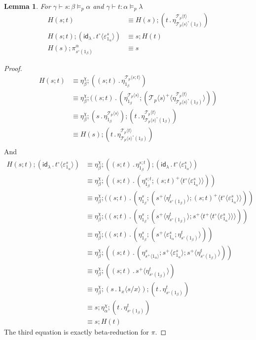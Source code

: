 \documentclass[10pt]{article}
\newtheorem{lemma}{Lemma}
\theoremstyle{definition}
\newcommand{\yields}{\vdash}
\newcommand\TrCirc[2]{\ensuremath{{#1}^\circ(#2)}}
\newcommand{\id}{\mathsf{id}}
\newcommand\ApEl[2]{\mathcal{T}_{#1}\langle#2\rangle}
\newcommand\ap[2]{\ensuremath{#1 \langle #2 \rangle }}
\newcommand\ApPlus[2]{\ensuremath{{#1}^+ \langle #2 \rangle }}
\newcommand\bdot[0]{\mathbin{.}}
\begin{document}
\begin{lemma}\label{lemma:h-on-composite}
For $\gamma \yields s : \beta \vDash_p \alpha$ and $\gamma \yields t : \alpha \vDash_p \lambda$
\begin{align*}
H(s;t) &\equiv H(s) ; (t \bdot \eta^{\ApEl{p}{t}}_{\TrCirc{\ApEl{p}{s}}{1_\beta}}) \\
H(s ; t) ; (\id_\lambda \bdot \ap{t^\circ}{\varepsilon^{s}_{1_{\alpha}}}) &\equiv s ; H(t) \\
H(s) ; \pi^\alpha_{\TrCirc{s}{1_\beta}} &\equiv s
\end{align*}
\end{lemma}
\begin{proof}
\begin{align*}
H(s;t)
&\equiv \eta^\chi_\beta ; ((s;t) \bdot \eta^{\ApEl{p}{s;t}}_{1_\beta}) \\
&\equiv \eta^\chi_\beta ; ((s;t) \bdot (\eta^{\ApEl{p}{s}}_{1_\beta} ; (\ApPlus{\ApEl{p}{s}}{\eta^{\ApEl{p}{t}}_{\TrCirc{\ApEl{p}{s}}{1_\beta}}})) \\
&\equiv \eta^\chi_\beta ; (s \bdot \eta^{\ApEl{p}{s}}_{1_\beta}) ; (t \bdot \eta^{\ApEl{p}{t}}_{\TrCirc{\ApEl{p}{s}}{1_\beta}}) \\
&\equiv H(s) ; (t \bdot \eta^{\ApEl{p}{t}}_{\TrCirc{\ApEl{p}{s}}{1_\beta}}) \\
\end{align*}
And
\begin{align*}
H(s ; t) ; (\id_\lambda \bdot \ap{t^\circ}{\varepsilon^{s}_{1_{\alpha}}})
&\equiv \eta^\chi_\beta ; ((s;t) \bdot \eta^{s;t}_{1_\beta}) ; (\id_\lambda \bdot \ap{t^\circ}{\varepsilon^{s}_{1_{\alpha}}}) \\
&\equiv \eta^\chi_\beta ; ((s;t) \bdot (\eta^{s;t}_{1_\beta} ; \ApPlus{(s;t)}{\ap{t^\circ}{\varepsilon^{s}_{1_{\alpha}}}})) \\
&\equiv \eta^\chi_\beta ; ((s;t) \bdot (\eta^s_{1_\beta} ; (\ApPlus{s}{\eta^{t}_{\TrCirc{s}{1_\beta}}} ; \ApPlus{(s;t)}{\ap{t^\circ}{\varepsilon^{s}_{1_{\alpha}}}})) \\
&\equiv \eta^\chi_\beta ; ((s;t) \bdot (\eta^s_{1_\beta} ; (\ApPlus{s}{\eta^{t}_{\TrCirc{s}{1_\beta}}} ; \ApPlus{s}{\ApPlus{t}{\ap{t^\circ}{\varepsilon^{s}_{1_{\alpha}}}}})) \\
&\equiv \eta^\chi_\beta ; ((s;t) \bdot (\eta^s_{1_\beta} ; (\ApPlus{s}{\varepsilon^{s}_{1_{\alpha}} ; \eta^{t}_{\TrCirc{s}{1_\beta}}} )) \\
&\equiv \eta^\chi_\beta ; ((s;t) \bdot (\eta^s_{\ApPlus{s}{1_\alpha}} ; \ap{s^+}{\varepsilon^{s}_{1_{\alpha}}} ; \ApPlus{s}{\eta^{t}_{\TrCirc{s}{1_\beta}}} )) \\
&\equiv \eta^\chi_\beta ; ((s;t) \bdot \ApPlus{s}{\eta^{t}_{\TrCirc{s}{1_\beta}}}) \\
&\equiv \eta^\chi_\beta ; (s \bdot \ap{1_x}{s/x}) ; (t \bdot \eta^{t}_{\TrCirc{s}{1_\beta}}) \\
&\equiv s ; \eta^\chi_\alpha ; (t \bdot \eta^{t}_{\TrCirc{s}{1_\beta}}) \\
&\equiv s ; H(t)
\end{align*}
The third equation is exactly beta-reduction for $\pi$.
\end{proof}
\end{document}
